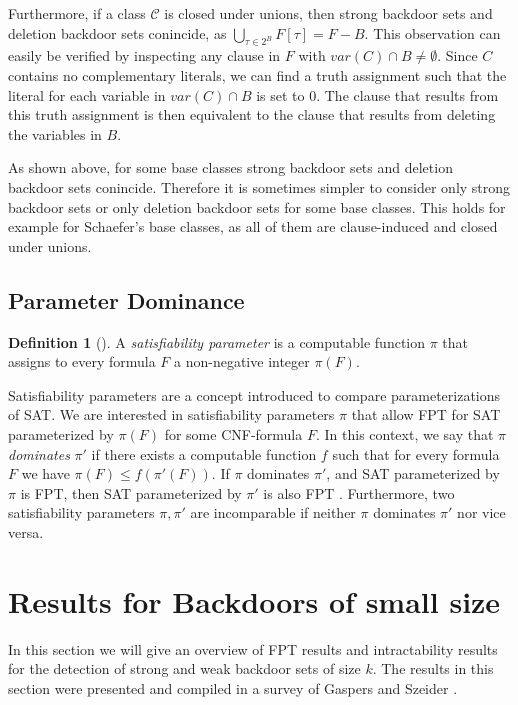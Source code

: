\documentclass[11pt,a4paper]{article}
\theoremstyle{definition}
\newtheorem{definition}{Definition}[section]
\theoremstyle{proposition}
\begin{document}
Furthermore, if a class $\mathcal{C}$ is closed under unions, then strong backdoor sets and deletion backdoor sets conincide, as $\bigcup_{\tau \in 2^B} F[\tau] = F - B$. This observation can easily be verified by inspecting any clause in $F$ with $var(C) \cap B \neq \emptyset$. Since $C$ contains no complementary literals, we can find a truth assignment such that the literal for each variable in $var(C) \cap B$ is set to 0. The clause that results from this truth assignment is then equivalent to the clause that results from deleting the variables in $B$. 

As shown above, for some base classes strong backdoor sets and deletion backdoor sets conincide. Therefore it is sometimes simpler to consider only strong backdoor sets or only deletion backdoor sets for some base classes. This holds for example for Schaefer's base classes, as all of them are clause-induced and closed under unions. 

\subsection{Parameter Dominance}
\begin{definition}[{\cite[p.422]{HandbookOfSAT}}]
A \textit{satisfiability parameter} is a computable function $\pi$ that assigns to every formula $F$ a non-negative integer $\pi(F)$. 
\end{definition}
Satisfiability parameters are a concept introduced to compare parameterizations of SAT. We are interested in satisfiability parameters $\pi$ that allow FPT for SAT parameterized by $\pi(F)$ for some CNF-formula $F$. In this context, we say that $\pi$ \textit{dominates} $\pi'$ if there exists a computable function $f$ such that for every formula $F$ we have $\pi(F) \leq f(\pi'(F))$. If $\pi$ dominates $\pi'$, and SAT parameterized by $\pi$ is FPT, then SAT parameterized by $\pi'$ is also FPT \cite[p.423]{HandbookOfSAT}. Furthermore, two satisfiability parameters $\pi, \pi'$ are incomparable if neither $\pi$ dominates $\pi'$ nor vice versa. 

\section{Results for Backdoors of small size}
\label{sec:smallbackdoors}

In this section we will give an overview of FPT results and intractability results for the detection of strong and weak backdoor sets of size $k$. The results in this section were presented and compiled in a survey of Gaspers and Szeider \cite{Gaspers2012}. 
\end{document}
